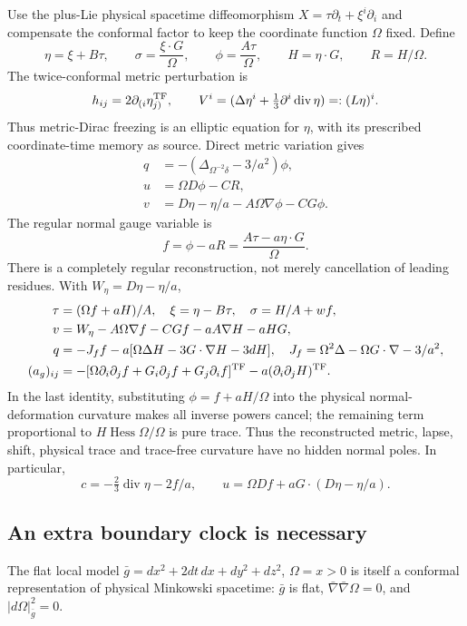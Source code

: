 Use the plus-Lie physical spacetime diffeomorphism $X=\tau\partial_t+\xi^i\partial_i$ and compensate the conformal factor to keep the coordinate function $\Omega$ fixed. Define
\[
 \eta=\xi+B\tau,\qquad \sigma=\frac{\xi\cdot G}{\Omega},\qquad
 \phi=\frac{A\tau}{\Omega},\qquad H=\eta\cdot G,\qquad R=H/\Omega.
\]
The twice-conformal metric perturbation is
\[
 h_{ij}=2\partial_{(i}\eta_{j)}^{\mathrm{TF}},\qquad
 V^i=(\Delta\eta^i+\tfrac13\partial^i\operatorname{div}\eta)=:(L\eta)^i.
\]
Thus metric-Dirac freezing is an elliptic equation for $\eta$, with its prescribed coordinate-time memory as source. Direct metric variation gives
\begin{align}
 q&=-\left(\Delta_{\Omega^{-2}\delta}-3/a^2\right)\phi,\\
 u&=\Omega D\phi-CR,\\
 v&=D\eta-\eta/a-A\Omega\nabla\phi-CG\phi.
\end{align}
The regular normal gauge variable is
\[
 f=\phi-aR=\frac{A\tau-a\eta\cdot G}{\Omega}.
\]
There is a completely regular reconstruction, not merely cancellation of leading residues. With $W_\eta=D\eta-\eta/a$,
\begin{align}
 \tau&=(\Omega f+aH)/A,\quad \xi=\eta-B\tau,\quad \sigma=H/A+wf,\\
 v&=W_\eta-A\Omega\nabla f-CGf-aA\nabla H-aHG,\\
 q&=-J_f f-a[\Omega\Delta H-3G\cdot\nabla H-3dH],
 \quad J_f=\Omega^2\Delta-\Omega G\cdot\nabla-3/a^2,\\
 (a_g)_{ij}&=-[\Omega\partial_i\partial_jf+G_i\partial_jf+G_j\partial_if]^{\mathrm{TF}}
             -a(\partial_i\partial_jH)^{\mathrm{TF}}.
\end{align}
In the last identity, substituting $\phi=f+aH/\Omega$ into the physical normal-deformation curvature makes all inverse powers cancel; the remaining term proportional to $H\operatorname{Hess}\Omega/\Omega$ is pure trace. Thus the reconstructed metric, lapse, shift, physical trace and trace-free curvature have no hidden normal poles.
In particular,
\begin{equation}
 c=-\tfrac23\operatorname{div}\eta-2f/a,
 \qquad u=\Omega Df+aG\cdot(D\eta-\eta/a).\label{regularfields}
\end{equation}

\subsection{An extra boundary clock is necessary}
The flat local model $\bar g=dx^2+2dt\,dx+dy^2+dz^2$, $\Omega=x>0$ is itself a conformal representation of physical Minkowski spacetime: $\bar g$ is flat, $\bar\nabla\bar\nabla\Omega=0$, and $|d\Omega|_{\bar g}^2=0$.

